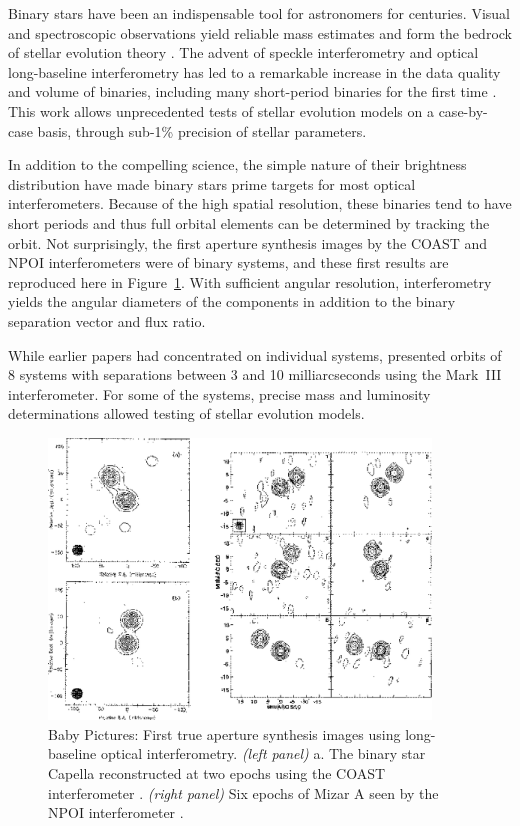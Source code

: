 \documentclass[12pt]{article}
\begin{document}
Binary stars have been an indispensable tool for astronomers for
centuries. Visual and spectroscopic observations yield reliable mass
estimates and form the bedrock of stellar evolution theory
\citep[e.g.,][]{eggen1967}.  The advent of speckle interferometry and
optical long-baseline interferometry has led to a remarkable increase
in the data quality and volume of binaries, including many
short-period binaries for the first time
\citep[e.g.,][]{mcalister1985, hartkopf2001}.  This work allows
unprecedented tests of stellar evolution models on a case-by-case
basis, through sub-1\% precision of stellar parameters.

In addition to the compelling science, the simple nature of their
brightness distribution have made binary stars prime targets for most
optical interferometers.  Because of the high spatial resolution,
these binaries tend to have short periods and thus full orbital
elements can be determined by tracking the orbit.  Not surprisingly,
the first aperture synthesis images by the COAST and NPOI
interferometers were of binary systems, and these first results are
reproduced here in Figure~\ref{babypictures}.  With sufficient angular
resolution, interferometry yields the angular diameters of the components in addition
to the binary separation vector and flux ratio.

While earlier papers had concentrated on individual systems,
\citet{hummel1995} presented orbits of 8 systems with separations
between 3 and 10 milliarcseconds using the Mark~III interferometer.
For some of the systems, precise mass and luminosity determinations
allowed testing of stellar evolution models.  

\begin{figure}[tbhp]
\begin{center}
\includegraphics[clip,angle=0,width=4.0in]{Figures/JDM_babypictures.eps}
\caption{\footnotesize Baby Pictures: First true aperture synthesis images using 
long-baseline optical interferometry.
{\em (left panel)} a. 
The binary star Capella reconstructed at two epochs using
the COAST interferometer \citep[see Figure~2 of][reproduced with permission of
ESO]{baldwin1996}.
{\em (right panel)} Six epochs of Mizar A seen by the NPOI interferometer
\citep[see Figure~4 of ][reproduced with permission of the AAS]{benson1997}.
\label{babypictures}}
\end{center}
\end{figure}
\end{document}
